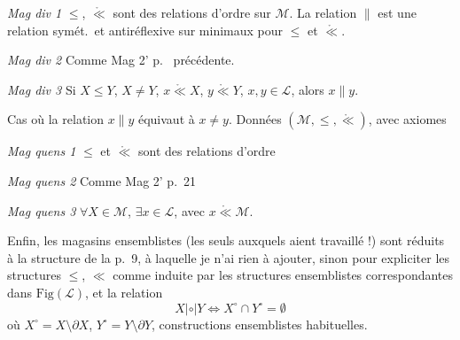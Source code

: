 \documentclass[11pt,a4paper]{article}
\begin{document}
\emph{Mag div 1} $\leq$, $\mathring{\ll}$ sont des relations d'ordre sur
$\mathcal{M}$. La relation $\|$ est une relation symét.\ et antiréflexive sur
 minimaux pour $\leq$ et
$\mathring{\ll}$.

\emph{Mag div 2} Comme Mag 2' p.~ précédente.

\emph{Mag div 3} Si $X \leq Y$, $X \neq Y$, $x \mathrel{\mathring{\ll}} X$,
$y \mathrel{\mathring{\ll}} Y$, $x, y \in \mathcal{L}$, alors $x \| y$.
\struck{\ill{}}


Cas  où la relation $x \| y$ équivaut à $x \neq y$.
Données $(\mathcal{M}, \leq, \mathring{\ll})$, avec axiomes

\emph{Mag quens 1} $\leq$ et $\mathring{\ll}$ sont des relations d'ordre

\emph{Mag quens 2} Comme Mag 2' p.~21

\emph{Mag quens 3} $\forall X \in \mathcal{M}$, $\exists x \in \mathcal{L}$,
avec $x \mathrel{\mathring{\ll}} \mathcal{M}$.


Enfin, les magasins ensemblistes (les seuls  
auxquels  aient travaillé   !)
sont réduits à la structure de la p.~9, à laquelle je n'ai rien à ajouter,
sinon pour expliciter les structures $\leq$, $\ll$ comme induite par les
structures ensemblistes correspondantes dans $\mathrm{Fig}(\mathcal{L})$, et la
\struck{\ill{}} relation
\[
  X \mathrel{|\circ|} Y \Longleftrightarrow X^{\circ} \cap Y^{\circ} = \emptyset
\]
où $X^{\circ} = X \setminus \partial X$, $Y^{\circ} = Y \setminus \partial Y$,
constructions ensemblistes habituelles.
\end{document}
